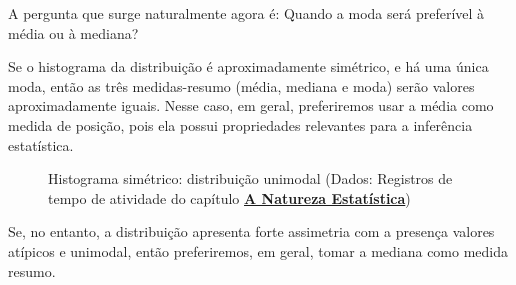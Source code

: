 A pergunta que surge naturalmente agora é: Quando a moda será preferível à média ou à mediana?

Se o histograma da distribuição é aproximadamente simétrico, e há uma única moda, então as três medidas-resumo (média, mediana e moda) serão valores aproximadamente iguais. Nesse caso, em geral, preferiremos usar a média como medida de posição, pois ela possui propriedades relevantes para a inferência estatística.

\begin{figure}[H]
\centering
\capstart

\caption{Histograma simétrico: distribuição unimodal (Dados: Registros de tempo de atividade do capítulo \textbf{\hyperref[est1-chap]{A Natureza Estatística}})}\label{\detokenize{PE104-1:id4}}\label{\detokenize{PE104-1:id18}}\end{figure}

Se, no entanto, a distribuição apresenta forte assimetria com a presença valores atípicos e unimodal, então preferiremos, em geral, tomar a mediana como medida resumo.


